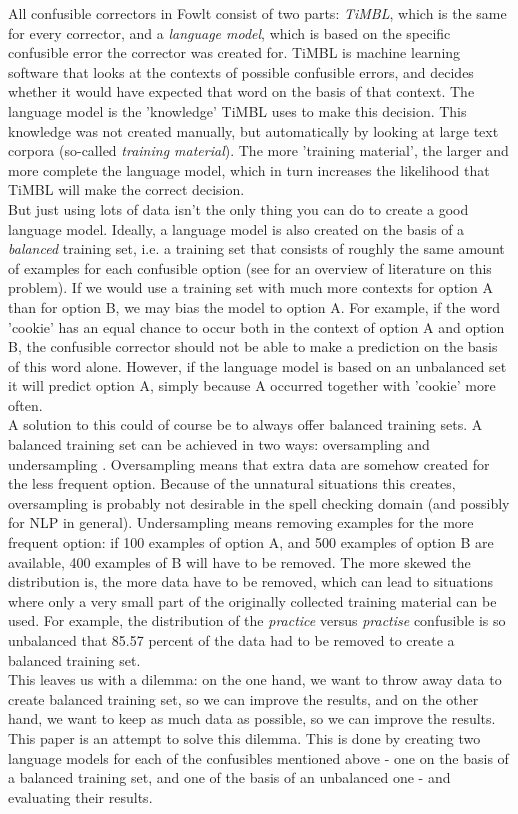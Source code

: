 \documentclass[12pt]{article}
\begin{document}
All confusible correctors in Fowlt consist of two parts: \emph{TiMBL}, which is the same for every corrector, and a \emph{language model}, which is based on the specific confusible error the corrector was created for. TiMBL is machine learning software that looks at the contexts of possible confusible errors, and decides whether it would have expected that word on the basis of that context. The language model is the 'knowledge' TiMBL uses to make this decision. This knowledge was not created manually, but automatically by looking at large text corpora (so-called \emph{training material}). The more 'training material', the larger and more complete the language model, which in turn increases the likelihood that TiMBL will make the correct decision. \\\indent
But just using lots of data isn't the only thing you can do to create a good language model. Ideally, a language model is also created on the basis of a \emph{balanced} training set, i.e. a training set that consists of roughly the same amount of examples for each confusible option (see \citealt{hg07} for an overview of literature on this problem). If we would use a training set with much more contexts for option A than for option B, we may bias the model to option A. For example, if the word 'cookie' has an equal chance to occur both in the context of option A and option B, the confusible corrector should not be able to make a prediction on the basis of this word alone. However, if the language model is based on an unbalanced set it will predict option A, simply because A occurred together with 'cookie' more often. \\\indent
A solution to this could of course be to always offer balanced training sets. A balanced training set can be achieved in two ways: oversampling and undersampling \citep{provost, gh09, vhkn07, hg07}. Oversampling means that extra data are somehow created for the less frequent option. Because of the unnatural situations this creates, oversampling is probably not desirable in the spell checking domain (and possibly for NLP in general). Undersampling means removing examples for the more frequent option: if 100 examples of option A, and 500 examples of option B are available, 400 examples of B will have to be removed. The more skewed the distribution is, the more data have to be removed, which can lead to situations where only a very small part of the originally collected training material can be used. For example, the distribution of the \emph{practice} versus \emph{practise} confusible is so unbalanced that 85.57 percent of the data had to be removed to create a balanced training set. \\\indent
This leaves us with a dilemma: on the one hand, we want to throw away data to create balanced training set, so we can improve the results, and on the other hand, we want to keep as much data as possible, so we can improve the results. This paper is an attempt to solve this dilemma. This is done by creating two language models for each of the confusibles mentioned above - one on the basis of a balanced training set, and one of the basis of an unbalanced one - and evaluating their results.
\end{document}
